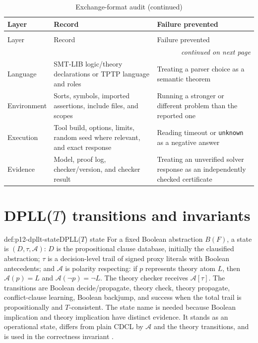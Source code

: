 \begin{longtable}{@{}p{}p{}p{}@{}}
\caption{Exchange-format audit.}
\label{tab:p12-exchange-format-audit}\\
\toprule
Layer & Record & Failure prevented \\ \midrule
\endfirsthead
\caption[]{Exchange-format audit (continued)}\\
\toprule
Layer & Record & Failure prevented \\ \midrule
\endhead
\midrule\multicolumn{3}{r}{\emph{continued on next page}}\\
\endfoot
\endlastfoot
Language & SMT-LIB logic/theory declarations or TPTP language and roles &
Treating a parser choice as a semantic theorem \\ \addlinespace
Environment & Sorts, symbols, imported assertions, include files, and scopes &
Running a stronger or different problem than the reported one \\ \addlinespace
Execution & Tool build, options, limits, random seed where relevant, and exact
response & Reading timeout or \texttt{unknown} as a negative answer \\ \addlinespace
Evidence & Model, proof log, checker/version, and checker result & Treating an
unverified solver response as an independently checked certificate \\
\bottomrule
\end{longtable}

\section{DPLL(\(T\)) transitions and invariants}

\begin{hbdefinition}{def:p12-dpllt-state}{DPLL(\(T\)) state}
For a fixed Boolean abstraction \(B(F)\), a state is
\((D,\tau,\mathcal A)\): \(D\) is the propositional clause database, initially
the clausified abstraction; \(\tau\) is a decision-level trail of signed proxy
literals with Boolean antecedents; and \(\mathcal A\) is polarity respecting:
if \(p\) represents theory atom \(L\), then
\(\mathcal A(p)=L\) and \(\mathcal A(\neg p)=\neg L\). The theory checker
receives \(\mathcal A[\tau]\). The transitions are Boolean decide/propagate,
theory check, theory propagate, conflict-clause learning, Boolean backjump,
and success when the total trail is propositionally and \(T\)-consistent.
The state name is needed because Boolean implication and theory implication
have distinct evidence. It stands as an operational state, differs from plain
CDCL by \(\mathcal A\) and the theory transitions, and is used in the
correctness invariant \cite{NieuwenhuisOliverasTinelli2006}.
\end{hbdefinition}

